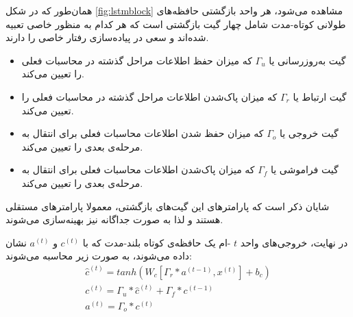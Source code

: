 همان‌طور که در شکل
\ref{fig:lstmblock}
مشاهده می‌شود، هر واحد بازگشتی حافظه‌های طولانی کوتاه-مدت شامل چهار گیت بازگشتی است که هر کدام به منظور خاصی تعبیه شده‌اند و سعی در پیاده‌سازی رفتار خاصی را دارند.

\begin{itemize}
    \item
    گیت به‌روزرسانی
    یا 
    $\Gamma_u$
    که میزان حفظ اطلاعات مراحل گذشته در محاسبات فعلی را تعیین می‌کند.
    
    \item
    گیت ارتباط
    یا 
    $\Gamma_r$
    که میزان پاک‌شدن اطلاعات مراحل گذشته در محاسبات فعلی را تعیین می‌کند.
    
    \item
    گیت خروجی
    یا 
    $\Gamma_o$
    که میزان حفظ شدن اطلاعات محاسبات فعلی برای انتقال به مرحله‌ی بعدی را تعیین می‌کند.
    
    \item
    گیت فراموشی
    یا
    $\Gamma_f$
    که میزان پاک‌شدن اطلاعات محاسبات فعلی برای انتقال به مرحله‌ی بعدی را تعیین می‌کند.
\end{itemize}

شایان ذکر است که پارامترهای این گیت‌های بازگشتی، معمولا پارامترهای مستقلی هستند و لذا به صورت جداگانه نیز بهینه‌سازی می‌شوند.

در نهایت، خروجی‌های واحد
$t$
-ام یک
حافظه‌ی کوتاه بلند-مدت که با
$c^{(t)}$
و
$a^{(t)}$
نشان داده می‌شوند،
به صورت زیر محاسبه می‌شوند:
\begin{equation}
\begin{gathered}
    \hat{c}^{(t)} = tanh(W_c[\Gamma_r * a^{(t-1)}, x^{(t)}] + b_c) \\
    c^{(t)} = \Gamma_u * \hat{c}^{(t)} + \Gamma_f * c^{(t-1)} \\
    a^{(t)} = \Gamma_o * c^{(t)}
\end{gathered}
\end{equation}

\newpage


